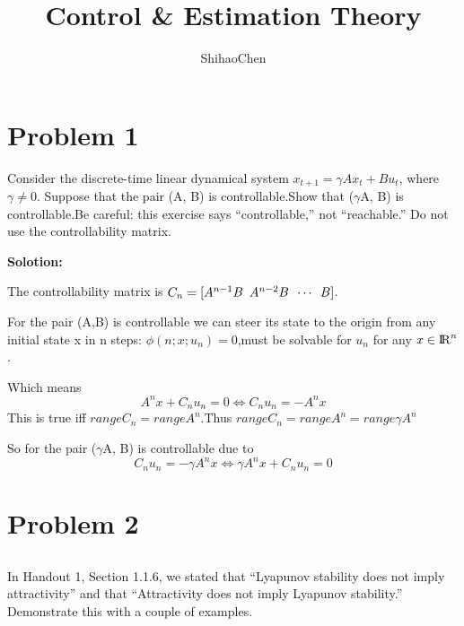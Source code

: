 \documentclass[a4paper,11pt,reqno]{amsart}
\title[ELE8088 Coursework]{Control \& Estimation Theory}
\author[S. Chen]{ShihaoChen}
\newcommand{\R}{{\rm I\!R}}
\begin{document}
\maketitle



\Large
\section{Problem 1}
Consider the discrete-time linear dynamical system $x_{t+1} = \gamma Ax_t + Bu_t$, where $\gamma \neq0$.
Suppose that the pair (A, B) is controllable.Show that ($\gamma$A, B) is controllable.Be careful: this exercise says
“controllable,” not “reachable.” Do not use the controllability matrix.

\textbf{Solotion:}

The controllability matrix is $C_n = [A^{n-1}B \hspace{0.5em} A^{n-2}B \hspace{0.5em} \cdots \hspace{0.5em} B ]$.

For the pair (A,B) is controllable we can steer its state to the origin from any initial state x in n steps:
$\phi(n;x;u_n) = 0$,must be solvable for $u_n$ for any $x\in\R^n$.

Which means 
\begin{equation}
    A^nx+C_nu_n = 0 \Leftrightarrow C_nu_n = -A^nx
\end{equation}
This is true iff $rangeC_n = rangeA^n$.Thus $rangeC_n = rangeA^n = range\gamma A^n$

So for the pair ($\gamma$A, B) is controllable due to 
\begin{equation}
    C_nu_n = -\gamma A^nx \Leftrightarrow \gamma A^nx+C_nu_n = 0
\end{equation}


\section{Problem 2}
\subsection{}
In Handout 1, Section 1.1.6, we stated that “Lyapunov stability does not imply attractivity” and
that “Attractivity does not imply Lyapunov stability.” Demonstrate this with a couple of examples.
\end{document}
